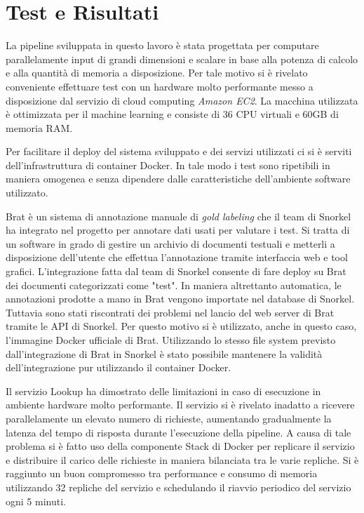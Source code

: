 \chapter{Test e Risultati}
\label{sec:results}


La pipeline sviluppata in questo lavoro è stata progettata per computare parallelamente input di grandi dimensioni e scalare in base alla potenza di calcolo e alla quantità di memoria a disposizione.
Per tale motivo si è rivelato conveniente effettuare test con un hardware molto performante messo a disposizione dal servizio di cloud computing \textit{Amazon EC2}. La macchina utilizzata è ottimizzata per il machine learning e consiste di 36 CPU virtuali e 60GB di memoria RAM.

Per facilitare il deploy del sistema sviluppato e dei servizi utilizzati ci si è serviti dell'infrastruttura di container Docker. In tale modo i test sono ripetibili in maniera omogenea e senza dipendere dalle caratteristiche dell'ambiente software utilizzato.

Brat è un sistema di annotazione manuale di \textit{gold labeling} che il team di Snorkel ha integrato nel progetto per annotare dati usati per valutare i test. Si tratta di un software in grado di gestire un archivio di documenti testuali e metterli a disposizione dell'utente che effettua l'annotazione tramite interfaccia web e tool grafici. L'integrazione fatta dal team di Snorkel consente di fare deploy su Brat dei documenti categorizzati come "test". In maniera altrettanto automatica, le annotazioni prodotte a mano in Brat vengono importate nel database di Snorkel. Tuttavia sono stati riscontrati dei problemi nel lancio del web server di Brat tramite le API di Snorkel. Per questo motivo si è utilizzato, anche in questo caso, l'immagine Docker ufficiale di Brat. Utilizzando lo stesso file system previsto dall'integrazione di Brat in Snorkel è stato possibile mantenere la validità dell'integrazione pur utilizzando il container Docker.

Il servizio Lookup ha dimostrato delle limitazioni in caso di esecuzione in ambiente hardware molto performante. Il servizio si è rivelato inadatto a ricevere parallelamente un elevato numero di richieste, aumentando gradualmente la latenza del tempo di risposta durante l'esecuzione della pipeline. A causa di tale problema si è fatto uso della componente Stack di Docker per replicare il servizio e distribuire il carico delle richieste in maniera bilanciata tra le varie repliche. Si è raggiunto un buon compromesso tra performance e consumo di memoria utilizzando 32 repliche del servizio e schedulando il riavvio periodico del servizio ogni 5 minuti.

